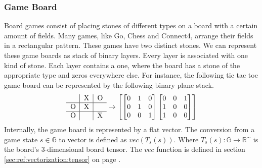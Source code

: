 \documentclass[12pt]{article}
\newcommand{\sectionref}[1]{section \ref{#1} on page \pageref{#1}}
\newcommand{\ticTacToe}[9]{
\begin{tabular}{p{7px}|p{7px}|p{7px}}
  #1 & #2 & #3 \\      \hline
  #4 & #5 & #6 \\      \hline
  #7 & #8 & #9 \\
\end{tabular}
}
\begin{document}
\subsubsection{Game Board}
Board games consist of placing stones of different types on a board with a certain amount of fields. Many games, like Go, Chess and Connect4, arrange their fields in a rectangular pattern. These games have two distinct stones. We can represent these game boards as stack of binary layers. Every layer is associated with one kind of stone. Each layer contains a one, where the board has a stone of the appropriate type and zeros everywhere else. For instance, the following tic tac toe game board can be represented by the following binary plane stack.\[
\ticTacToe{}{X}{O}{O}{X}{}{O}{}{X}\to
\left[ 
\begin{bmatrix}
0 & 1 & 0 \\
0 & 1 & 0 \\
0 & 0 & 1 \\
\end{bmatrix}
\begin{bmatrix}
0 & 0 & 1 \\
1 & 0 & 0 \\
1 & 0 & 0 \\
\end{bmatrix}
\right]
\] 
Internally, the game board is represented by a flat vector. The conversion from a game state \(s  \in \mathbb G\) to vector is defined as \(vec(T_s(s))\). Where \(T_s(s):\mathbb G \to \mathbb R^{\cdots}\) is the board's 3-dimensional board tensor. The \(vec\) function is defined in \sectionref{sec:ref:vectorization:tensor}.
\end{document}
